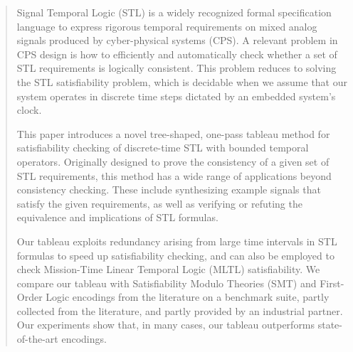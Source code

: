 \documentclass[acmsmall,screen]{acmart}
\begin{document}
\begin{abstract}
Signal Temporal Logic (STL) is a widely recognized formal specification language to express rigorous temporal requirements on mixed analog signals produced by cyber-physical systems (CPS).
A relevant problem in CPS design is how to efficiently and automatically check whether a set of STL requirements is logically consistent.
This problem reduces to solving the STL satisfiability problem, which is decidable when we assume that our system operates in discrete time steps dictated by an embedded system's clock.

This paper introduces a novel tree-shaped, one-pass tableau method for satisfiability checking of discrete-time STL with bounded temporal operators. Originally designed to prove the consistency of a given set of STL requirements, this method has a wide range of applications beyond consistency checking.
These include synthesizing example signals that satisfy the given requirements, as well as verifying or refuting the equivalence and implications of STL formulas.

Our tableau exploits redundancy arising from large time intervals in STL formulas to speed up satisfiability checking,
and can also be employed to check Mission-Time Linear Temporal Logic (MLTL) satisfiability.
We compare our tableau with Satisfiability Modulo Theories (SMT) and First-Order Logic encodings from the literature
on a benchmark suite, partly collected from the literature, and partly provided by an industrial partner.
Our experiments show that, in many cases, our tableau outperforms state-of-the-art encodings.

\end{abstract}


\maketitle
\end{document}
